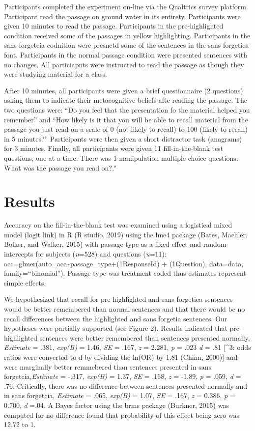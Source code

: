 \documentclass[pdf]{apa6}
\begin{document}
Participants completed the experiment on-line via the Qualtrics survey platform. Participant read the passage on ground water in its entirety. Participants were given 10 minutes to read the passage. Participants in the pre-highlighted condition received some of the passages in yellow highlighting. Participants in the sans forgetcia codnition were presnetd some of the sentences in the sans forgetica font. Participants in the normal passage condition were presented sentences with no changes. All particiapnts were instructed to read the passage as though they were studying material for a class.

After 10 minutes, all participants were given a brief questionnaire (2 questions) asking them to indicate their metacognitive beliefs afte reading the passage. The two questions were: \enquote{Do you feel that the presentation fo the material helped you remember} and \enquote{How likely is it that you will be able to recall material from the passage you just read on a scale of 0 (not likely to recall) to 100 (likely to recall) in 5 minutes?} Participants were then given a short distractor task (anagrams) for 3 minutes. Finally, all participants were given 11 fill-in-the-blank test questions, one at a time. There was 1 manipulation multiple choice questions: What was the passage you read on?."

\hypertarget{results-1}{%
\section{Results}\label{results-1}}

Accuracy on the fill-in-the-blank test was examined using a logistical mixed model (logit link) in R (R studio, 2019) using the lme4 package (Bates, Machler, Bolker, and Walker, 2015) with passage type as a fixed effect and random intercepts for subjects (\emph{n}=528) and questions (\emph{n}=11): acc=glmer(auto\_acc\textasciitilde{}passage\_type+(1\textbar{}ResponseId) + (1\textbar{}Question), data=data, family=\enquote{binomial}). Passage type was treatment coded thus estimates represent simple effects.

We hypothesized that recall for pre-highlighted and sans forgetica sentences would be better remembered than normal sentences and that there would be no recall differences between the highlighted and sans forgetia sentences. Our hypotheses were partially supported (see Figure 2). Results indicated that pre-highlighted sentences were better remembered than sentences presented normally, \emph{Estimate} = .381, \emph{exp(B)} = 1.46, \emph{SE} = .167, \emph{z} = 2.281, \emph{p} = .023 \emph{d} = .81 {[}\^{}3: odds ratios were converted to d by dividing the ln(OR) by 1.81 (Chinn, 2000){]} and were marginally better remmebered than sentences presented in sans forgetcia,\emph{Estimate} = -.317, \emph{exp(B)} = 1.37, \emph{SE} = .168, \emph{z} = -1.89, \emph{p} = .059, \emph{d} = .76. Critically, there was no difference between sentences presented normally and in sans forgetcia, \emph{Estimate} = .065, \emph{exp(B)} = 1.07, \emph{SE} = .167, \emph{z} = 0.386, \emph{p} = 0.700, \emph{d} =.04. A Bayes factor using the brms package (Burkner, 2015) was computed for no difference found that probability of this effect being zero was 12.72 to 1.
\end{document}
